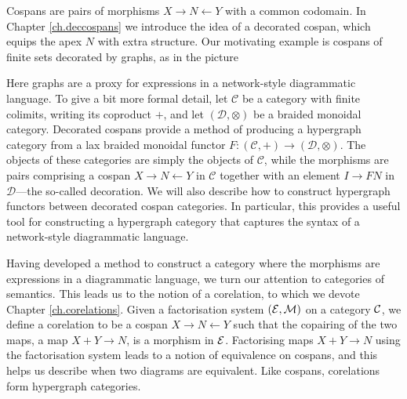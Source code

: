 Cospans are pairs of morphisms $X \to N \leftarrow Y$ with a common codomain.
In Chapter \ref{ch.deccospans} we introduce the idea of a decorated cospan, which
equips the apex $N$ with extra structure. Our motivating example is cospans of
finite sets decorated by graphs, as in the picture
\begin{center}
\end{center}
Here graphs are a proxy for expressions in a network-style diagrammatic
language. To give a bit more formal detail, let $\mathcal C$ be a category with
finite colimits, writing its coproduct $+$, and let $(\mathcal D, \otimes)$ be a
braided monoidal category. Decorated cospans provide a method of producing a
hypergraph category from a lax braided monoidal functor $F\colon (\mathcal C,+)
\to (\mathcal D, \otimes)$. The objects of these categories are simply the
objects of $\mathcal C$, while the morphisms are pairs comprising a cospan $X
\rightarrow N \leftarrow Y$ in $\mathcal C$ together with an element $I \to FN$
in $\mathcal D$---the so-called decoration. We will also describe how to
construct hypergraph functors between decorated cospan categories. In
particular, this provides a useful tool for constructing a hypergraph category
that captures the syntax of a network-style diagrammatic language.

Having developed a method to construct a category where the morphisms are
expressions in a diagrammatic language, we turn our attention to categories of
semantics. This leads us to the notion of a corelation, to which we devote
Chapter \ref{ch.corelations}. Given a factorisation system $(\mathcal E,\mathcal M)$ on a
category $\mathcal C$, we define a corelation to be a cospan $X \to N \leftarrow Y$
such that the copairing of the two maps, a map $X+Y \to N$, is a morphism in
$\mathcal E$. Factorising maps $X+Y \to N$ using the factorisation system leads to a
notion of equivalence on cospans, and this helps us describe when two diagrams
are equivalent. Like cospans, corelations form hypergraph categories.


